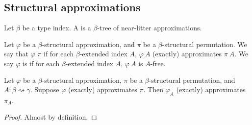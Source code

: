 \subsection{Structural approximations}

\begin{definition}
    Let \( \beta \) be a type index.
    A  is a \( \beta \)-tree of near-litter approximations.
\end{definition}
\begin{definition}
    Let \( \varphi \) be a \( \beta \)-structural approximation, and \( \pi \) be a \( \beta \)-structural permutation.
    We say that \( \varphi \)   \( \pi \) if for each \( \beta \)-extended index \( A \), \( \varphi\ A \) (exactly) approximates \( \pi\ A \).
    We say \( \varphi \) is  if for each \( \beta \)-extended index \( A \), \( \varphi\ A \) is \( A \)-free.
\end{definition}
\begin{lemma}
    Let \( \varphi \) be a \( \beta \)-structural approximation, \( \pi \) be a \( \beta \)-structural permutation, and \( A : \beta \rightsquigarrow \gamma \).
    Suppose \( \varphi \) (exactly) approximates \( \pi \).
    Then \( \varphi_A \) (exactly) approximates \( \pi_A \).
\end{lemma}
\begin{proof}
    Almost by definition.
\end{proof}
